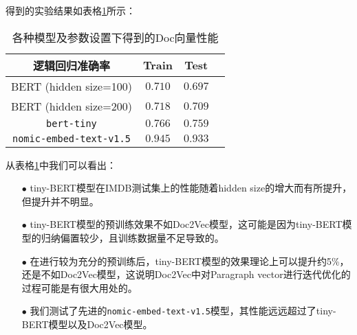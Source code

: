 \documentclass{article}
\begin{document}
得到的实验结果如表格\ref{tab:results}所示：
\begin{table}[htbp]
  \caption{\small{各种模型及参数设置下得到的Doc向量性能}}
  \label{tab:results}
  \centering
  \begin{tabular}{cccc}
    \toprule
    逻辑回归准确率          & Train   & Test    \\
    \midrule
    BERT (hidden size=100)  & $0.710$ & $0.697$ \\
    \midrule
    BERT (hidden size=200)  & $0.718$ & $0.709$ \\
    \midrule
    \verb|bert-tiny| & $0.766$ & $0.759$ \\
    \midrule
    \verb|nomic-embed-text-v1.5| & $0.945$ & $0.933$ \\
    \bottomrule
  \end{tabular}
\end{table}

从表格\ref{tab:results}中我们可以看出：
\begin{itemize}
  \item[$\bullet$] tiny-BERT模型在IMDB测试集上的性能随着hidden size的增大而有所提升，但提升并不明显。
  \item[$\bullet$] tiny-BERT模型的预训练效果不如Doc2Vec模型，这可能是因为tiny-BERT模型的归纳偏置较少，且训练数据量不足导致的。
  \item[$\bullet$] 在进行较为充分的预训练后，tiny-BERT模型的效果理论上可以提升约5\%，还是不如Doc2Vec模型，这说明Doc2Vec中对Paragraph vector进行迭代优化的过程可能是有很大用处的。
  \item[$\bullet$] 我们测试了先进的\verb|nomic-embed-text-v1.5|模型，其性能远远超过了tiny-BERT模型以及Doc2Vec模型。
\end{itemize}






\end{document}
